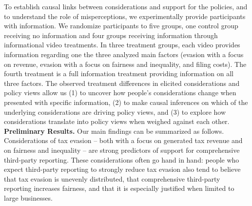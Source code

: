 \documentclass[12pt]{article}
\begin{document}
To establish causal links between considerations and support for the policies, and to understand the role of misperceptions, we experimentally provide participants with information. We randomize participants to five groups, one control group receiving no information and four groups receiving information through informational video treatments. In three treatment groups, each video provides information regarding one the three analyzed main factors (evasion with a focus on revenue, evasion with a focus on fairness and inequality, and filing costs). The fourth treatment is a full information treatment providing information on all three factors. The observed treatment differences in elicited considerations and policy views allow us (1) to uncover how people's considerations change when presented with specific information, (2) to make causal inferences on which of the underlying considerations are driving policy views, and (3) to explore how considerations translate into policy views when weighed against each other.   \\

\textbf{Preliminary Results.}
Our main findings can be summarized as follows. Considerations of tax evasion -- both with a focus on generated tax revenue and on fairness and inequality -- are strong predictors of support for comprehensive third-party reporting. These considerations often go hand in hand: people who expect third-party reporting to strongly reduce tax evasion also tend to believe that tax evasion is unevenly distributed, that comprehensive third-party reporting increases fairness, and that it is especially justified when limited to large businesses.
\end{document}
